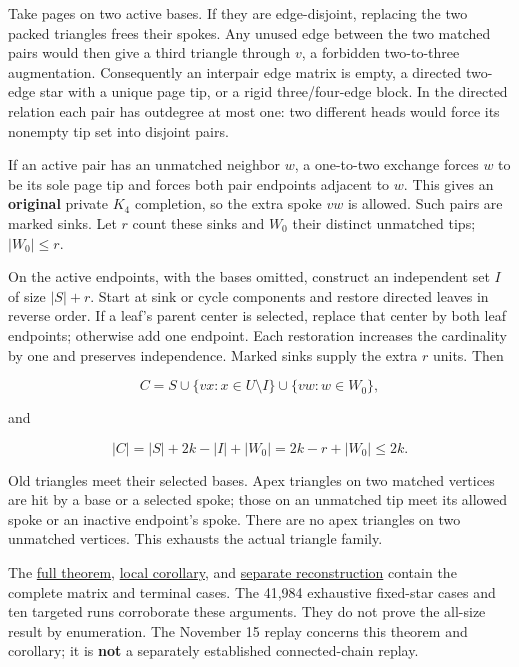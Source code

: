 \documentclass[11pt,a4paper]{article}
\begin{document}
Take pages on two active bases. If they are edge-disjoint, replacing the two packed triangles frees their spokes. Any unused edge between the two matched pairs would then give a third triangle through \(v\), a forbidden two-to-three augmentation. Consequently an interpair edge matrix is empty, a directed two-edge star with a unique page tip, or a rigid three/four-edge block. In the directed relation each pair has outdegree at most one: two different heads would force its nonempty tip set into disjoint pairs.

If an active pair has an unmatched neighbor \(w\), a one-to-two exchange forces \(w\) to be its sole page tip and forces both pair endpoints adjacent to \(w\). This gives an \textbf{original} private \(K_4\) completion, so the extra spoke \(vw\) is allowed. Such pairs are marked sinks. Let \(r\) count these sinks and \(W_0\) their distinct unmatched tips; \(|W_0|\le r\).

On the active endpoints, with the bases omitted, construct an independent set \(I\) of size \(|S|+r\). Start at sink or cycle components and restore directed leaves in reverse order. If a leaf's parent center is selected, replace that center by both leaf endpoints; otherwise add one endpoint. Each restoration increases the cardinality by one and preserves independence. Marked sinks supply the extra \(r\) units. Then

\[C=S\cup\{vx:x\in U\setminus I\}\cup\{vw:w\in W_0\},\]

and

\[|C|=|S|+2k-|I|+|W_0|=2k-r+|W_0|\le2k.\]

Old triangles meet their selected bases. Apex triangles on two matched vertices are hit by a base or a selected spoke; those on an unmatched tip meet its allowed spoke or an inactive endpoint's spoke. There are no apex triangles on two unmatched vertices. This exhausts the actual triangle family.

The \href{https://github.com/pappa211/ai-math-experiments/blob/main/problems/TUZA-18/notes/criticality_star_pk_theorem.md}{full theorem}, \href{https://github.com/pappa211/ai-math-experiments/blob/main/problems/TUZA-18/notes/criticality_star_local_dichotomy.md}{local corollary}, and \href{https://github.com/pappa211/ai-math-experiments/blob/main/problems/TUZA-18-replay/RECONSTRUCTION.md}{separate reconstruction} contain the complete matrix and terminal cases. The 41,984 exhaustive fixed-star cases and ten targeted runs corroborate these arguments. They do not prove the all-size result by enumeration. The November 15 replay concerns this theorem and corollary; it is \textbf{not} a separately established connected-chain replay.
\end{document}
